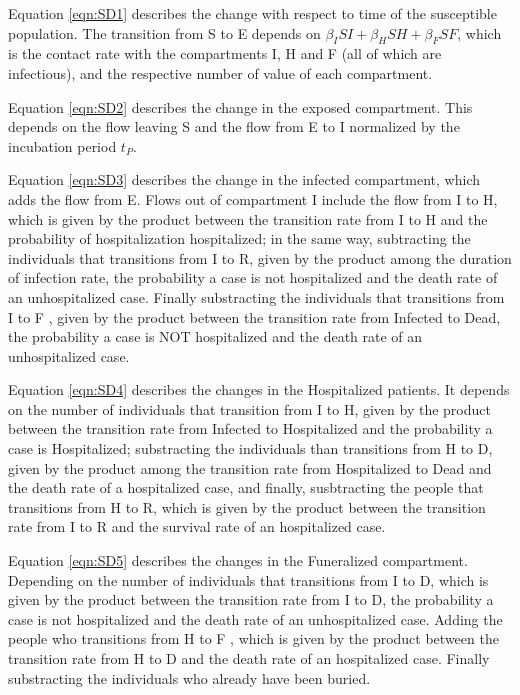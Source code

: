 

%


Equation \ref{eqn:SD1} describes the change with respect to time of the susceptible population. The transition from S to E depends on $\beta_{I}SI+\beta_{H}SH+\beta_{F}SF$, which is the contact rate with the compartments I, H and F (all of which are infectious), and the respective number of value of each compartment.

Equation \ref{eqn:SD2} describes the change in the exposed compartment. This depends on the flow leaving S and the flow from E to I normalized by the incubation period $t_P$.

Equation \ref{eqn:SD3} describes the change in the infected compartment, which adds the flow from E. Flows out of compartment I include the flow from I to H, which is given by the product between the transition rate from I to H and the probability of hospitalization hospitalized; in the same way, subtracting the individuals that transitions from I to R, given by  the product among the duration of infection rate, the probability a case is not hospitalized and the death rate of an unhospitalized case. Finally substracting the individuals that transitions from I to F , given by the product between the transition rate from Infected to Dead,  the probability a case is NOT hospitalized and the death rate of an unhospitalized case.

Equation \ref{eqn:SD4} describes the changes in the Hospitalized patients. It depends on the number of individuals that transition from I to H, given by the  product between the transition rate from Infected to Hospitalized and the probability a case is Hospitalized;  substracting the individuals than transitions from H to D, given by the product among the transition rate from Hospitalized to Dead and the death rate of a hospitalized case, and finally, susbtracting the people that transitions from H to R, which is given by the product between the transition rate from I to R and the survival rate of an hospitalized case.

Equation \ref{eqn:SD5} describes the changes in the Funeralized compartment.  Depending on the number of individuals that transitions from I to D, which is given by the product between the transition rate from I to D, the probability a case is not hospitalized and the death rate of an unhospitalized case. Adding the people who transitions from H to F , which is given by the product between the transition rate from H to D and the death rate of an hospitalized case. Finally substracting the individuals who already have been buried.

